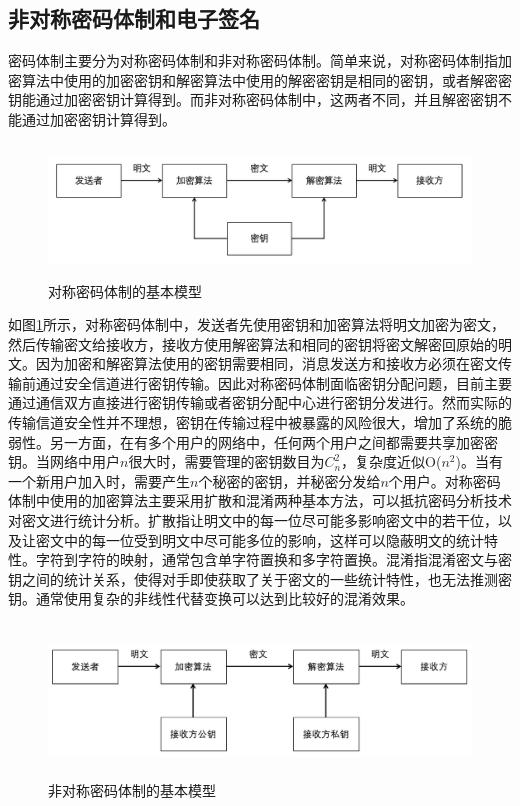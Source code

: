 \subsection{非对称密码体制和电子签名}

密码体制主要分为对称密码体制和非对称密码体制。简单来说，对称密码体制指加密算法中使用的加密密钥和解密算法中使用的解密密钥是相同的密钥，或者解密密钥能通过加密密钥计算得到。而非对称密码体制中，这两者不同，并且解密密钥不能通过加密密钥计算得到。

\begin{figure}
\centering	
\includegraphics [width=400pt,height=100pt]{figures/sym-crypto.png}
\caption{对称密码体制的基本模型}
\label{fig:sym-crypto}
\end{figure}

如图\ref{fig:sym-crypto}所示，对称密码体制中，发送者先使用密钥和加密算法将明文加密为密文，然后传输密文给接收方，接收方使用解密算法和相同的密钥将密文解密回原始的明文。因为加密和解密算法使用的密钥需要相同，消息发送方和接收方必须在密文传输前通过安全信道进行密钥传输。因此对称密码体制面临密钥分配问题，目前主要通过通信双方直接进行密钥传输或者密钥分配中心进行密钥分发进行。然而实际的传输信道安全性并不理想，密钥在传输过程中被暴露的风险很大，增加了系统的脆弱性。另一方面，在有多个用户的网络中，任何两个用户之间都需要共享加密密钥。当网络中用户$n$很大时，需要管理的密钥数目为$C_n^2$，复杂度近似O($n^2$)。当有一个新用户加入时，需要产生$n$个秘密的密钥，并秘密分发给$n$个用户。对称密码体制中使用的加密算法主要采用扩散和混淆两种基本方法，可以抵抗密码分析技术对密文进行统计分析。扩散指让明文中的每一位尽可能多影响密文中的若干位，以及让密文中的每一位受到明文中尽可能多位的影响，这样可以隐蔽明文的统计特性。字符到字符的映射，通常包含单字符置换和多字符置换。混淆指混淆密文与密钥之间的统计关系，使得对手即使获取了关于密文的一些统计特性，也无法推测密钥。通常使用复杂的非线性代替变换可以达到比较好的混淆效果。

\begin{figure}
\centering	
\includegraphics [width=400pt,height=115pt]{figures/asym-crypto.png}
\caption{非对称密码体制的基本模型}
\label{fig:asym-crypto}
\end{figure}

